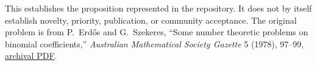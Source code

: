 \documentclass[11pt]{article}
\begin{document}
This establishes the proposition represented in the repository.  It does
not by itself establish novelty, priority, publication, or community
acceptance.  The original problem is from P.~Erd\H{o}s and G.~Szekeres,
``Some number theoretic problems on binomial coefficients,''
\emph{Australian Mathematical Society Gazette} 5 (1978), 97--99,
\href{https://www.renyi.hu/~p_erdos/1978-46.pdf}{archival PDF}.
\end{document}
